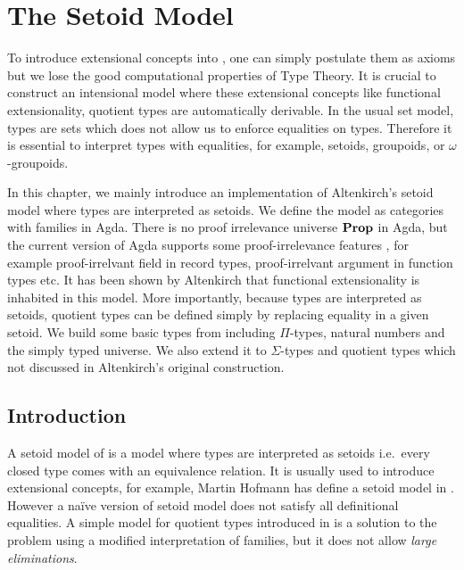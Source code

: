 

\chapter{The Setoid Model}\label{models}


To introduce extensional concepts into \itt, one can simply postulate them as axioms but we lose the good computational properties of Type Theory.  It is crucial to construct an intensional model where these extensional concepts like functional extensionality, quotient types are automatically derivable. In the usual set model, types are sets which does not allow us to enforce equalities on types. Therefore it is essential to interpret types with equalities, for example, setoids, groupoids, or $\omega$-groupoids. 


In this chapter, we mainly introduce an implementation of Altenkirch's setoid model  \cite{alti:lics99}  where types are interpreted as setoids. We define the model as categories with families in Agda. There is no proof irrelevance universe $\operatorname{\mathbf{Prop}}$ in Agda, but the current version of Agda supports some proof-irrelevance features \cite{prAgda}, for example proof-irrelvant field in record types, proof-irrelvant argument in function types etc. It has been shown by Altenkirch \cite{alti:lics99} that functional extensionality is inhabited in this model. More importantly, because types are interpreted as setoids, quotient types can be defined simply by replacing equality in a given setoid.
We build some basic types from \cite{alti:lics99} including $\Pi$-types, natural numbers and the simply typed universe. We also extend it to $\Sigma$-types and quotient types which not discussed in Altenkirch's original construction.

\section{Introduction}\label{setoidmodel}


A setoid model of \itt is a model where types are interpreted as setoids i.e.\ every closed type comes with an equivalence relation. It is usually used to introduce extensional concepts, for example, Martin Hofmann has define a setoid model in \cite{hof:phd}. However a naïve version of setoid model does not satisfy all definitional equalities. 
A simple model for quotient types introduced in \cite{hof:95:sm} is a solution to the problem using a modified interpretation of families, but it does not allow \emph{large eliminations}.

